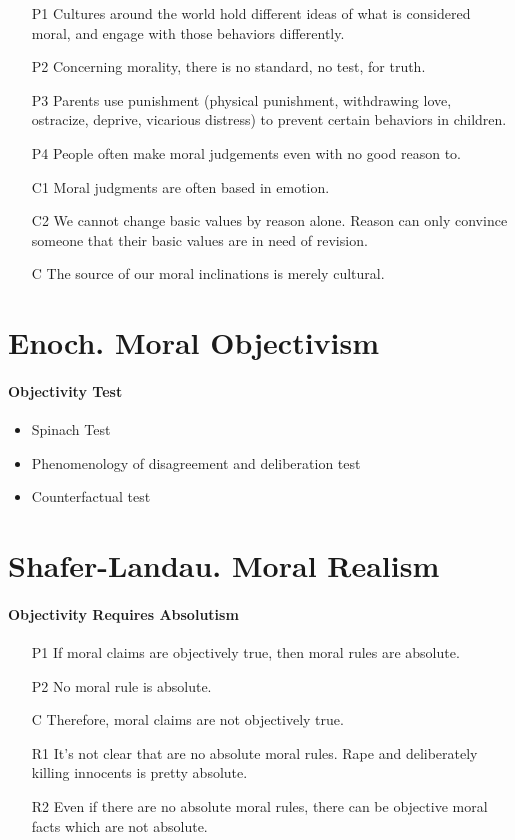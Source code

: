 \documentclass[12pt]{article}
\begin{document}
\begin{itemize}
    \item [P1] Cultures around the world hold different ideas of what is considered moral, and engage with those behaviors differently.
    \item [P2] Concerning morality, there is no standard, no test, for truth.
    \item [P3] Parents use punishment (physical punishment, withdrawing love, ostracize, deprive, vicarious distress) to prevent certain behaviors in children. 
    \item [P4] People often make moral judgements even with no good reason to.
    \item [C1] Moral judgments are often based in emotion.
    \item [C2] We cannot change basic values by reason alone. Reason can only convince someone that their basic values are in need of revision.
    \item [C] The source of our moral inclinations is merely cultural.
\end{itemize}

\section{Enoch. Moral Objectivism}

\paragraph{Objectivity Test}
\begin{itemize}
    \item Spinach Test
    \item Phenomenology of disagreement and deliberation test
    \item Counterfactual test
\end{itemize}

\section{Shafer-Landau. Moral Realism}

\paragraph{Objectivity Requires Absolutism}
\begin{itemize}
    \item [P1] If moral claims are objectively true, then moral rules are absolute.
    \item [P2] No moral rule is absolute.
    \item [C] Therefore, moral claims are not objectively true.
    \item [R1] It's not clear that are no absolute moral rules. Rape and deliberately killing innocents is pretty absolute.
    \item [R2] Even if there are no absolute moral rules, there can be objective moral facts which are not absolute.
\end{itemize}
\end{document}
